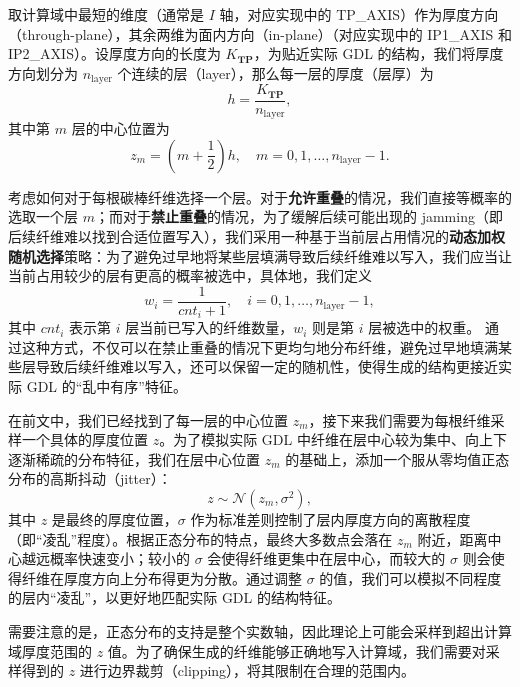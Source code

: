 取计算域中最短的维度（通常是 $I$ 轴，对应实现中的 TP\_AXIS）作为厚度方向（through-plane），其余两维为面内方向（in-plane）（对应实现中的 IP1\_AXIS 和 IP2\_AXIS）。设厚度方向的长度为 $K_{\textbf{TP}}$，为贴近实际 GDL 的结构，我们将厚度方向划分为 $n_{\mathrm{layer}}$ 个连续的层（layer），那么每一层的厚度（层厚）为
\begin{equation}
h = \dfrac{K_{\textbf{TP}}}{n_{\mathrm{layer}}},
\end{equation}
其中第 $m$ 层的中心位置为
\begin{equation}
z_m = \left(m + \dfrac 1 2\right)h, \quad m=0,1,\ldots,n_{\mathrm{layer}}-1.
\end{equation}

考虑如何对于每根碳棒纤维选择一个层。对于\textbf{允许重叠}的情况，我们直接等概率的选取一个层 $m$；而对于\textbf{禁止重叠}的情况，为了缓解后续可能出现的 jamming（即后续纤维难以找到合适位置写入），我们采用一种基于当前层占用情况的\textbf{动态加权随机选择}策略：为了避免过早地将某些层填满导致后续纤维难以写入，我们应当让当前占用较少的层有更高的概率被选中，具体地，我们定义
\begin{equation}
w_i = \dfrac{1}{cnt_i + 1}, \quad i=0,1,\ldots,n_{\mathrm{layer}}-1,
\end{equation}
其中 $cnt_i$ 表示第 $i$ 层当前已写入的纤维数量，$w_i$ 则是第 $i$ 层被选中的权重。
通过这种方式，不仅可以在禁止重叠的情况下更均匀地分布纤维，避免过早地填满某些层导致后续纤维难以写入，还可以保留一定的随机性，使得生成的结构更接近实际 GDL 的“乱中有序”特征。

在前文中，我们已经找到了每一层的中心位置 $z_m$，接下来我们需要为每根纤维采样一个具体的厚度位置 $z$。为了模拟实际 GDL 中纤维在层中心较为集中、向上下逐渐稀疏的分布特征，我们在层中心位置 $z_m$ 的基础上，添加一个服从零均值正态分布的高斯抖动（jitter）\cite{chen2023multivariate}：
\begin{equation}
z \sim \mathcal{N}(z_m,\sigma^2),
\end{equation}
其中 $z$ 是最终的厚度位置，$\sigma$ 作为标准差则控制了层内厚度方向的离散程度（即“凌乱”程度）。根据正态分布的特点，最终大多数点会落在 $z_m$ 附近，距离中心越远概率快速变小；较小的 $\sigma$ 会使得纤维更集中在层中心，而较大的 $\sigma$ 则会使得纤维在厚度方向上分布得更为分散。通过调整 $\sigma$ 的值，我们可以模拟不同程度的层内“凌乱”，以更好地匹配实际 GDL 的结构特征。

需要注意的是，正态分布的支持是整个实数轴，因此理论上可能会采样到超出计算域厚度范围的 $z$ 值。为了确保生成的纤维能够正确地写入计算域，我们需要对采样得到的 $z$ 进行边界裁剪（clipping），将其限制在合理的范围内。

